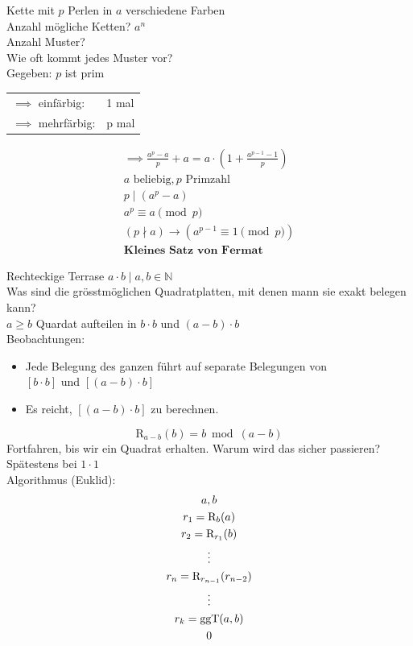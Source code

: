 \begin{bsp}[note = Kombinatorik (\enquote{systematisches Zählen})]
	Kette mit $p$ Perlen in $a$ verschiedene Farben \\
	Anzahl mögliche Ketten? $a^n$ \\
	Anzahl Muster? \\
	Wie oft kommt jedes Muster vor? \\
	Gegeben: $p$ ist prim \\
	\begin{tabular}{ l l }
	$\implies$ einfärbig:		& 1 mal \\
	$\implies$ mehrfärbig:	& p mal
	\end{tabular}
	\begin{gather*}
		\implies \frac{a^p - a}{p} + a = a \cdot ( 1 + \frac{a^{p-1} - 1}{p} ) \\
		a \text{ beliebig}, p \text{ Primzahl} \\
		p \mid ( a^p - a ) \\
		a^p \equiv a \pmod p \\
		( p \nmid a ) \rightarrow ( a^{p-1} \equiv 1 \pmod p ) \\
		\textbf{Kleines Satz von Fermat}
	\end{gather*}
\end{bsp}

\begin{bsp}[note = Geometrie]
	Rechteckige Terrase $a \cdot b \mid a,b \in \mathbb{N}$ \\
	Was sind die grösstmöglichen Quadratplatten, mit denen mann sie exakt belegen kann? \\
	$a \geq b$ \quad Quardat aufteilen in $b \cdot b$ und $(a-b) \cdot b$ \\
	Beobachtungen:
	\begin{itemize}
		\item Jede Belegung des ganzen führt auf separate Belegungen von \\$[b \cdot b]$ und $[(a-b) \cdot b]$
		\item Es reicht, $[(a-b) \cdot b]$ zu berechnen.
	\end{itemize}
	$$\mathrm{R}_{a-b}(b) = b \bmod (a-b)$$
	Fortfahren, bis wir ein Quadrat erhalten. Warum wird das sicher passieren? \\
	\quad Spätestens bei $1 \cdot 1$\\
	Algorithmus (Euklid):
	\begin{gather*}
		a , b \\
		r_1 = \mathrm{R}_b(a) \\
		r_2 = \mathrm{R}_{r_1}(b) \\
		\vdots \\
		r_n = \mathrm{R}_{r_{n-1}}(r_{n-2}) \\
		\vdots \\
		r_k = \operatorname{ggT}(a,b) \\
		0
	\end{gather*}
\end{bsp}

